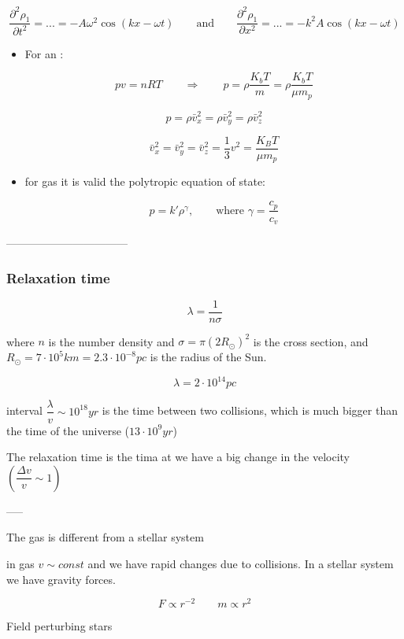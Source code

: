 $$
\dfrac{\partial^2 \rho_1}{\partial t^2} = ... = - A \omega^2 \cos (k x - \omega t)
\qquad \text{and} \qquad
\dfrac{\partial^2 \rho_1}{\partial x^2} = ... = - k^2 A\cos (k x - \omega t)
$$

\begin{itemize}
\item For an :

$$
pv = n R T
\qquad \Rightarrow \qquad
p = \rho \dfrac{K_b T}{m}
= \rho \dfrac{K_b T}{\mu m_p}
$$

$$
p = \rho \bar v_x^2 = \rho \bar v_y^2 = \rho \bar v_z^2
$$

$$
\bar v_x^2 = \bar v_y^2 = \bar v_z^2 = \dfrac 13 v^2 = \dfrac{K_B T}{\mu m_p}
$$

\item for  gas it is valid the polytropic equation of state:

$$
p = k' \rho^\gamma, \qquad \text{where } \gamma = \dfrac{c_p}{c_v}
$$

\end{itemize}

---------------------------------

\subsubsection{Relaxation time}

$$
\lambda = \dfrac 1 {n \sigma}
$$

where $n$ is the number density and $\sigma = \pi (2 R_\odot)^2$ is the cross section, and $R_\odot = 7 \cdot 10^5 km = 2.3 \cdot 10^{-8} pc$ is the radius of the Sun.

$$
\lambda = 2 \cdot 10^{14} pc
$$

interval $\dfrac{\lambda}{v} \sim 10^{18} yr$ is the time between two collisions, which is much bigger than the time of the universe ($13 \cdot 10^9 yr$)

The relaxation time is the tima at we have a big change in the velocity $(\dfrac{\Delta v}{v} \sim 1)$

-----

The gas is different from a stellar system

in gas $v \sim const$ and we have rapid changes due to collisions. In a stellar system we have gravity forces.

$$
F \propto r^{-2} \qquad m \propto r^2
$$


Field perturbing stars


